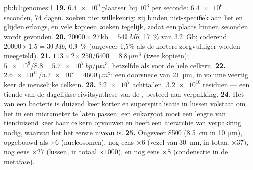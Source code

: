 \begin{solution}{pb:b1:genomes:1}
\textbf{19.} $\num{6.4e9}$ plaatsen bij $10^3$ per seconde: $\num{6.4e6}$
seconden, 74 dagen.  zoeken niet willekeurig: zij binden niet-specifiek aan
het  en glijden erlangs, en vele kopieën zoeken tegelijk, zodat een plaats
binnen seconden wordt gevonden.
\textbf{20.} $\num{20000}\times 27\,\mathrm{kb} = \qty{540}{Mb}$, \qty{17}{\%} van
\qty{3.2}{Gb}; coderend $\num{20000}\times 1.5 =
\qty{30}{Mb}$, \qty{0.9}{\%} (ongeveer 1,5\% als de kortere  zorgvuldiger
worden meegeteld).
\textbf{21.} $113\times 2\times 250/6400 = \qty{8.8}{\micro m^3}$ (twee kopieën);
$\num{5e8}/8.8 = \qty{5.7e7}{bp/\micro m^3}$, hetzelfde als voor de hele celkern.
\textbf{22.} $\num{2.6e11}/\num{5.7e7} = \qty{4600}{\micro m^3}$: een doorsnede van
\qty{21}{\micro m}, in volume veertig keer de menselijke celkern.
\textbf{23.} $\num{3.2e7}$ achttallen, $\num{3.2e10}$ residuen --- een tiende van
de dagelijkse eiwitsynthese van de , besteed aan verpakking.
\textbf{24.} Het  van een bacterie is duizend keer korter en
superspiralisatie in lussen volstaat om het in een micrometer te laten passen; een
eukaryoot moet een lengte van tienduizend keer haar celkern opvouwen en heeft een
hiërarchie van verpakking nodig, waarvan het  het eerste niveau is.
\textbf{25.} Ongeveer \num{8500} (\qty{8.5}{cm} in \qty{10}{\micro m}), opgebouwd
als $\times 6$ (nucleosomen), nog eens $\times 6$ (vezel van \qty{30}{nm}, in
totaal $\times 37$), nog eens $\times 27$ (lussen, in totaal $\times 1000$), en nog
eens $\times 8$ (condensatie in de metafase).
\end{solution}
